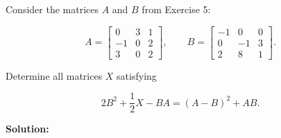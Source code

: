 \item Consider the matrices $A$ and $B$ from Exercise 5:

$$
A = \begin{bmatrix}
    0 & 3 & 1 \\
    -1 & 0 & 2 \\
    3 & 0 & 2
\end{bmatrix},
\qquad
B = \begin{bmatrix}
    -1 & 0 & 0 \\
    0 & -1 & 3 \\
    2 & 8 & 1
\end{bmatrix}.
$$

Determine all matrices $X$ satisfying

$$
2B^2 + \frac{1}{2}X - BA = (A-B)^2 + AB.
$$

\textbf{Solution:}


